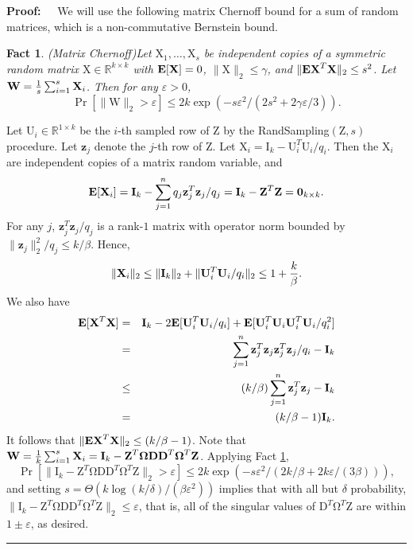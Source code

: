\documentclass[11pt]{article}
\newenvironment{proof}{\begin{trivlist} \item {\bf Proof:~~}}
  {\qed\end{trivlist}}
\newcommand{\mat}[1]{{\ensuremath{\bm{\mathrm{#1}}}}}
\def\matD{\mat{D}}
\def\matI{\mat{I}}
\def\matU{\mat{U}}
\def\matW{\mat{W}}
\def\matX{\mat{X}}
\def\matZ{\mat{Z}}
\def\frac#1#2{{#1\over #2}}
\def\qed{\hfill\rule{2mm}{2mm}}
\def\z{{\mathbf z}}
\newcommand{\eps}{\varepsilon}
\newtheorem{fact}{Fact}
\begin{document}
\begin{proof}
We will use the following matrix Chernoff bound for a sum of random matrices, 
which is a non-commutative Bernstein bound.

\begin{fact}(Matrix Chernoff)\label{fact:chernoff}
Let $\matX_1, \ldots, \matX_s$ be independent copies of a symmetric random matrix $\matX \in \mathbb{R}^{k \times k}$ 
with ${\bf E}[\matX] = 0$, $\|\matX\|_2 \leq \gamma$, and $\|{\bf E} \matX^T \matX\|_2 \leq s^2$. 
Let $\matW = \frac{1}{s} \sum_{i=1}^s \matX_i$. Then for any $\eps > 0$,
$$\Pr[\|\matW\|_2 > \eps] \leq 2k \exp(-s\eps^2/(2s^2 + 2\gamma \eps/3)).$$ 
\end{fact}
Let $\matU_i \in \mathbb{R}^{1 \times k}$ be the $i$-th sampled row of $\matZ$ by the 
{\textsc RandSampling}$(\matZ, s)$ procedure.
Let
$\z_j$ denote the $j$-th row of $\matZ$. 
Let $\matX_i = \matI_{k} - \matU_i^T \matU_i / q_i$. Then the $\matX_i$ 
are independent copies of a matrix random variable, and  
$${\bf E}[\matX_i] = \matI_{k} - \sum_{j=1}^n q_j \z_j^T \z_j /q_j 
= \matI_{k} - \matZ^T \matZ = \mat0_{k \times k}.$$
For any $j$, $\z_j^T \z_j/q_j$ is a rank-$1$ matrix with 
operator norm bounded by $\|\z_j\|_2^2/q_j \leq k/\beta$. Hence,
\begin{eqnarray}\label{eqn:operator}
\|\matX_i\|_2 \leq \|\matI_{k}\|_2 + \|\matU_i^T \matU_i / q_i\|_2 \leq 1 + \frac{k}{\beta}.
\end{eqnarray}
We also have
\begin{eqnarray}\label{eqn:varBern}
{\bf E}[\matX^T \matX] & = & \matI_{k} - 2 {\bf E}[\matU_i^T \matU_i/q_i] 
+ {\bf E}[\matU_i^T \matU_i \matU_i^T \matU_i/q_i^2] \notag \\
& = & \sum_{j=1}^n \z_j^T \z_j \z_j^T \z_j/q_i - \matI_{k}\\
& \leq & (k/\beta) \sum_{j=1}^n \z_j^T \z_j - \matI_{k}\\
& = & (k/\beta - 1) \matI_{k}.
\end{eqnarray}
It follows that $\|{\bf E}\matX^T \matX\|_2 \leq (k/\beta - 1)$. 
Note that $\matW = \frac{1}{k} \sum_{i=1}^s \matX_i = \matI_{k} - \matZ^T \mat\Omega \matD \matD^T \mat\Omega^T \matZ$. 
Applying Fact \ref{fact:chernoff},
$$\Pr[\|\matI_{k} - \matZ^T \mat\Omega \matD \matD^T \mat\Omega^T \matZ \|_2 > \eps] \leq 2k \exp(-s \eps^2/(2k/\beta + 2k \eps /(3\beta))),$$
and setting $s = \Theta(k \log (k/\delta) /(\beta \eps^2))$ 
implies that with all but $\delta$ probability,
$\|\matI_{k} - \matZ^T \mat\Omega \matD \matD^T \mat\Omega^T \matZ \|_2 \leq \eps$, 
that is, all of the singular values of $\matD^T \mat\Omega^T \matZ$ are within $1 \pm \eps$, as desired. 
\end{proof}
\end{document}
